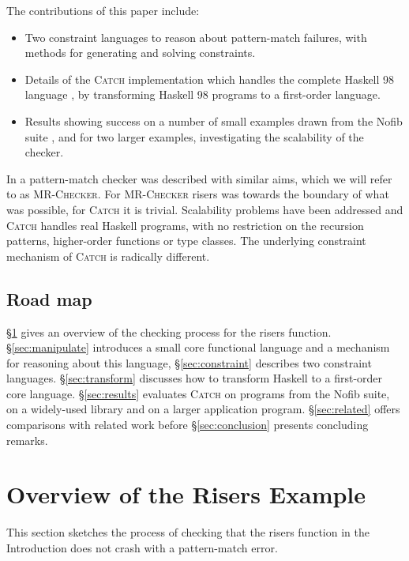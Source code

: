 \documentclass[preprint]{sigplanconf}
\newcommand{\C}[1]{\textsf{#1}}
\newcommand{\catch}{\textsc{Catch}}
\newcommand{\newtool}{\anon{\catch07}{\catch}}
\newcommand{\oldtool}{\anon{\catch05}{\textsc{MR-Checker}}}
\newcommand{\anon}[2]{#2}
\begin{document}
The contributions of this paper include:

\begin{itemize}
\item Two constraint languages to reason about pattern-match failures, with methods for generating and solving constraints.
\item Details of the \catch{} implementation which handles the complete Haskell 98 language \citep{haskell}, by transforming Haskell 98 programs to a first-order language.
\item Results showing success on a number of small examples drawn from the Nofib suite \citep{nofib}, and for two larger examples, investigating the scalability of the checker.
\end{itemize}

In \citet{me:catch_tfp} a pattern-match checker was described with similar aims, which we will refer to as \oldtool{}\anon{\footnote{Although the paper was completed in 2005, publication was delayed}}{}. For \oldtool{} \C{risers} was towards the boundary of what was possible, for \newtool{} it is trivial. Scalability problems have been addressed and \newtool{} handles real Haskell programs, with no restriction on the recursion patterns, higher-order functions or type classes. The underlying constraint mechanism of \newtool{} is radically different.

\subsection{Road map}

\S\ref{sec:walkthrough} gives an overview of the checking process for the \C{risers} function. \S\ref{sec:manipulate} introduces a small core functional language and a mechanism for reasoning about this language, \S\ref{sec:constraint} describes two constraint languages. \S\ref{sec:transform} discusses how to transform Haskell to a first-order core language. \S\ref{sec:results} evaluates \newtool{} on programs from the Nofib suite, on a widely-used library and on a larger application program. \S\ref{sec:related} offers comparisons with related work before \S\ref{sec:conclusion} presents concluding remarks.

\section{Overview of the Risers Example}
\label{sec:walkthrough}

This section sketches the process of checking that the \C{risers} function in the Introduction does not crash with a pattern-match error.
\end{document}
